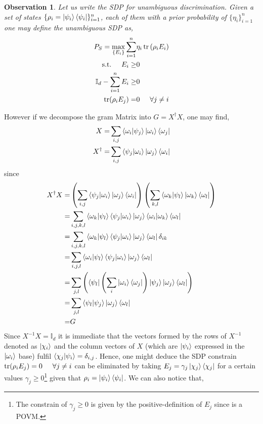 \documentclass[12pt,letterpaper]{article}
\DeclareMathOperator{\tr}{tr}
\newtheorem{observation}{Observation}
\begin{document}
\begin{multicols}{2}
\begin{observation}
Let us write the SDP for unambiguous discrimination. Given a set of states $\{\rho_i=\ket{\psi_i}\bra{\psi_i}\}_{i=1}^{n}$, each of them with a prior probability of $\{\eta_i\}_{i=1}^{n}$ one may define the unambiguous SDP as,
\begin{align}
P_S=\max_{\{E_i\}}\sum_{i=1}^{n}&\eta_i\tr{(\rho_iE_i)}\\
\text{s.t.}\hspace{0.5cm}E_i\geq&0\\
\mathbb{I}_d-\sum_{i=1}^{n}E_i\geq&0\\
\tr(\rho_iE_j)=&0\hspace{0.5cm}\forall j\neq i
\end{align}
\end{observation}
However if we decompose the gram Matrix into $G=X^\dagger X$, one may find,
\begin{align}
X=&\sum_{i,j}\braket{\omega_i|\psi_j}\ket{\omega_i}\bra{\omega_j}\\
X^\dagger=&\sum_{i,j}\braket{\psi_j|\omega_i}\ket{\omega_j}\bra{\omega_i}
\end{align}
since 
\begin{align}
X^\dagger X=&\left(\sum_{i,j}\braket{\psi_j|\omega_i}\ket{\omega_j}\bra{\omega_i}\right)\left(\sum_{k,l}\braket{\omega_k|\psi_l}\ket{\omega_k}\bra{\omega_l}\right)\\
=&\sum_{i,j,k,l}\braket{\omega_k|\psi_l}\braket{\psi_j|\omega_i}\ket{\omega_j}\braket{\omega_i|\omega_k}\bra{\omega_l}\\
=&\sum_{i,j,k,l}\braket{\omega_k|\psi_l}\braket{\psi_j|\omega_i}\ket{\omega_j}\bra{\omega_l}\delta_{ik}\\
=&\sum_{i,j,l}\braket{\omega_i|\psi_l}\braket{\psi_j|\omega_i}\ket{\omega_j}\bra{\omega_l}\\
=&\sum_{j,l}\left(\bra{\psi_l}\left(\sum_{i}\ket{\omega_{i}}\bra{\omega_j}\right)\ket{\psi_j}\ket{\omega_j}\bra{\omega_l}\right)\\
=&\sum_{j,l}\braket{\psi_l|\psi_j}\ket{\omega_j}\bra{\omega_l}\\
=&G
\end{align}
Since $X^{-1}X=\mathbb{I}_d$ it is immediate that the vectors formed by the rows of $X^{-1}$ denoted as $\ket{\chi_i}$ and the column vectors of $X$ (which are $\ket{\psi_i}$ expressed in the $\ket{\omega_{i}}$ base) fulfil $\braket{\chi_j|\psi_i}=\delta_{i,j}$. Hence, one might deduce the SDP constrain $\tr(\rho_iE_j)=0\hspace{0.5cm}\forall j\neq i$ can be eliminated by taking $E_j=\gamma_j\ket{\chi_j}\bra{\chi_j}$ for a certain values $\gamma_j\geq0$\footnote{The constrain of $\gamma_j\geq 0$ is given by the positive-definition of $E_j$ since is a POVM.} given that $\rho_i=\ket{\psi_i}\bra{\psi_i}$. We can also notice that,

\end{multicols}
\end{document}
